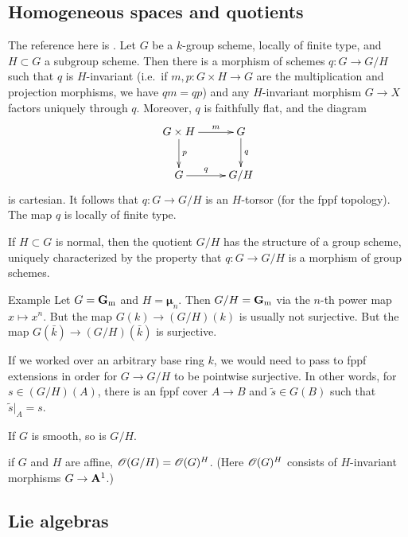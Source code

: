 \subsection{Homogeneous spaces and quotients}

The reference here is \cite[VI$_\mathrm{A}$ \S 3]{sga3}. Let $G$ be a $k$-group 
scheme, locally of finite type, and $H\subset G$ a subgroup scheme. Then there is 
a morphism of schemes $q:G\to G/H$ such that $q$ is $H$-invariant (i.e.~if 
$m,p:G\times H\to G$ are the multiplication and projection morphisms, we have 
$q m = q p$) and any $H$-invariant morphism $G\to X$ factors uniquely 
through $q$. Moreover, $q$ is faithfully flat, and the diagram 
\[\xymatrix{
  G\times H \ar[r]^-m \ar[d]^-p  
    & G \ar[d]^-q \\
  G \ar[r]^-q 
    & G/H 
}\]
is cartesian. It follows that $q:G\to G/H$ is an $H$-torsor (for the 
fppf topology). The map $q$ is locally of finite type. 

If $H\subset G$ is normal, then the quotient $G/H$ has the structure of 
a group scheme, uniquely characterized by the property that 
$q:G\to G/H$ is a morphism of group schemes. 

\begin{enonce}{Example}
Let $G=\mathbf{G}_{\mathrm{m}}$ and $H=\boldsymbol\mu_n$. Then $G/H=\mathbf{G}_{\mathrm{m}}$ via the 
$n$-th power map $x\mapsto x^n$. But the map $G(k) \to (G/H)(k)$ is usually 
not surjective. But the map $G(\bar k) \to (G/H)(\bar k)$ is surjective. 
\end{enonce}

If we worked over an arbitrary base ring $k$, we would need to pass to 
fppf extensions in order for $G\to G/H$ to be pointwise surjective. In 
other words, for $s\in (G/H)(A)$, there is an fppf cover $A\to B$ and 
$\widetilde s\in G(B)$ such that $\widetilde s|_A = s$. 

If $G$ is smooth, so is $G/H$. 

if $G$ and $H$ are affine, $\mathscr{O}(G/H)=\mathscr{O}(G)^H$. (Here 
$\mathscr{O}(G)^H$ consists of $H$-invariant morphisms $G\to \mathbf{A}^1$.)





\subsection{Lie algebras}

